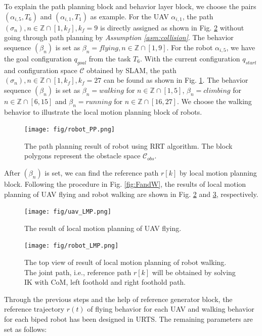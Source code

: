 \documentclass{ieeeaccess}
\begin{document}
To explain the path planning block and behavior layer block, we choose the pairs $(\alpha_{i,5},T_6)$ and $(\alpha_{i,1}, T_1)$ as example. For the UAV $\alpha_{i,1}$, the path $(\sigma_n),n\in\mathbb{Z}\cap[1,k_f],k_f=9$ is directly assigned as shown in Fig. \ref{sim:flying} without going through path planning by \textit{Assumption \ref{asm:collision}}. The behavior sequence $(\beta_n)$ is set as $\beta_n=\mathit{flying}, n\in\mathbb{Z}\cap[1,9]$. For the robot $\alpha_{i,5}$, we have the goal configuration $q_{goal}$ from the task $T_6$. With the current configuration $q_{start}$ and configuration space $\mathcal{C}$ obtained by SLAM, the path $(\sigma_n),n\in\mathbb{Z}\cap[1,k_f],k_f=27$ can be found as shown in Fig. \ref{fig:R_task}. The behavior sequence $(\beta_n)$ is set as $\beta_n=\mathit{walking}$ for $n\in\mathbb{Z}\cap[1,5]$, $\beta_n=\mathit{climbing}$ for $n\in\mathbb{Z}\cap[6,15]$ and $\beta_n=\mathit{running}$ for $n\in\mathbb{Z}\cap[16,27]$. We choose the walking behavior to illustrate the local motion planning block of robots.
\begin{figure}[htbp]
    \centering
    \texttt{[image: fig/robot\_PP.png]}\caption{The path planning result of robot using RRT algorithm. The block polygons represent the obstacle space $\mathcal{C}_{obs}$.}%
    \label{fig:R_task}
\end{figure}

After $(\beta_n)$ is set, we can find the reference path $r[k]$ by local motion planning block. Following the procedure in Fig. \ref{fig:FandW}, the results of local motion planning of UAV flying and robot walking are shown in Fig. \ref{sim:flying} and \ref{sim:walking}, respectively.
\begin{figure}[htbp]
    \centering
    \texttt{[image: fig/uav\_LMP.png]}\caption{The result of local motion planning of UAV flying.}%
    \label{sim:flying}
\end{figure}
\begin{figure}[htbp]
    \centering
    \texttt{[image: fig/robot\_LMP.png]}\caption{The top view of result of local motion planning of robot walking. The joint path, i.e., reference path $r[k]$ will be obtained by solving IK with CoM, left foothold and right foothold path.}
    \label{sim:walking}
\end{figure}

Through the previous steps and the help of reference generator block, the reference trajectory $r(t)$ of flying behavior for each UAV and walking behavior for each biped robot has been designed in URTS. The remaining parameters are set as follows:
\end{document}
